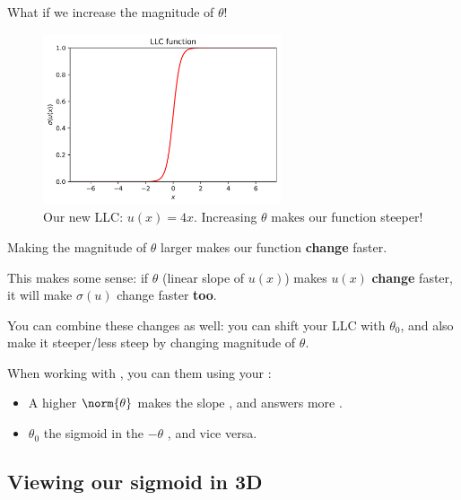          What if we increase the magnitude of $\theta$!
         
         \begin{figure}[H]
            \centering
            \includegraphics[width=70mm,scale=0.5]{images/classification_images/theta_x4.png}
            \caption*{Our new LLC: $u(x)=4x$. Increasing $\theta$ makes our function steeper!}
        \end{figure}
        
        Making the magnitude of $\theta$ larger makes our function \textbf{change} faster. 
        
        This makes some sense: if $\theta$ (linear slope of $u(x)$) makes $u(x)$ \textbf{change} faster, it will make $\sigma(u)$ change faster \textbf{too}.
        
        You can combine these changes as well: you can shift your LLC with $\theta_0$, and also make it steeper/less steep by changing magnitude of $\theta$.\\
        
        \begin{concept}
            When working with , you can  them using your :\\
            
            \begin{itemize}
                \item A higher  $\norm{\theta}$ makes the slope , and answers more .
                
                \item {} $\theta_0$  the sigmoid in the $-\theta$ , and vice versa.
            \end{itemize}
        \end{concept}
        
    \subsection*{Viewing our sigmoid in 3D}
        
